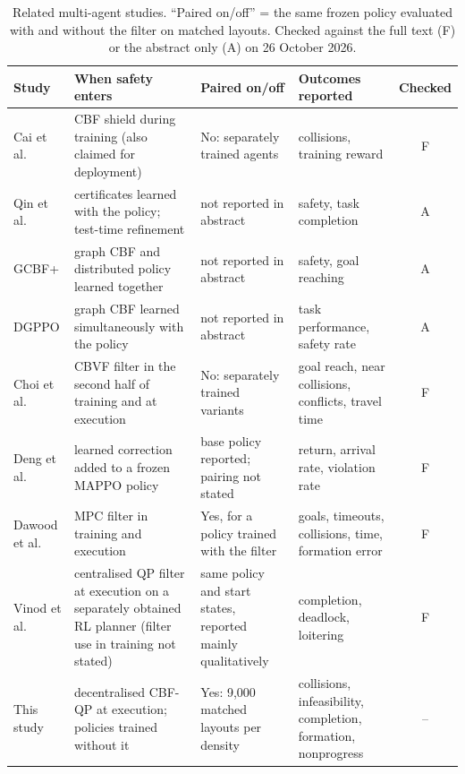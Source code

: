 \documentclass[journal]{IEEEtran}
\begin{document}
\begin{table}[t]
\centering\footnotesize
\caption{Related multi-agent studies. ``Paired on/off'' = the same frozen policy evaluated with and
without the filter on matched layouts. Checked against the full text (F) or the abstract only (A) on
26 October 2026.}
\label{tab:related}
\footnotesize
\begin{tabular}{>{\raggedright\arraybackslash}p{2.2cm}>{\raggedright\arraybackslash}p{4.8cm}>{\raggedright\arraybackslash}p{4.0cm}>{\raggedright\arraybackslash}p{4.0cm}c}
\toprule
Study & When safety enters & Paired on/off & Outcomes reported & Checked\\
\midrule
Cai et al. \cite{cai2021} & CBF shield during training (also claimed for deployment) & No: separately trained agents & collisions, training reward & F\\
Qin et al. \cite{qin2021} & certificates learned with the policy; test-time refinement & not reported in abstract & safety, task completion & A\\
GCBF+ \cite{zhang2025gcbf} & graph CBF and distributed policy learned together & not reported in abstract & safety, goal reaching & A\\
DGPPO \cite{zhang2025dgppo} & graph CBF learned simultaneously with the policy & not reported in abstract & task performance, safety rate & A\\
Choi et al. \cite{choi2025} & CBVF filter in the second half of training and at execution & No: separately trained variants & goal reach, near collisions, conflicts, travel time & F\\
Deng et al. \cite{deng2026} & learned correction added to a frozen MAPPO policy & base policy reported; pairing not stated & return, arrival rate, violation rate & F\\
Dawood et al. \cite{dawood2025} & MPC filter in training and execution & Yes, for a policy trained with the filter & goals, timeouts, collisions, time, formation error & F\\
Vinod et al. \cite{vinod2022} & centralised QP filter at execution on a separately obtained RL planner (filter use in training not stated) & same policy and start states, reported mainly qualitatively & completion, deadlock, loitering & F\\
This study & decentralised CBF-QP at execution; policies trained without it & Yes: 9{,}000 matched layouts per density & collisions, infeasibility, completion, formation, nonprogress & --\\
\bottomrule
\end{tabular}
\end{table}
\end{document}
